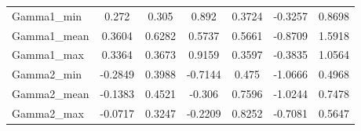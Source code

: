 \begin{table}[h]
\begin{tabular}{l S[table-format=1.4] S[table-format=1.4] S[table-format=1.4] S[table-format=1.4] S[table-format=1.4]}
        Gamma1_min & 0.272 & 0.305 & 0.892 & 0.3724 & -0.3257 & 0.8698 \\
        Gamma1_mean & 0.3604 & 0.6282 & 0.5737 & 0.5661 & -0.8709 & 1.5918 \\
        Gamma1_max & 0.3364 & 0.3673 & 0.9159 & 0.3597 & -0.3835 & 1.0564 \\
        Gamma2_min & -0.2849 & 0.3988 & -0.7144 & 0.475 & -1.0666 & 0.4968 \\
        Gamma2_mean & -0.1383 & 0.4521 & -0.306 & 0.7596 & -1.0244 & 0.7478 \\
        Gamma2_max & -0.0717 & 0.3247 & -0.2209 & 0.8252 & -0.7081 & 0.5647 \\
        \bottomrule
    \end{tabular}
\end{table}
